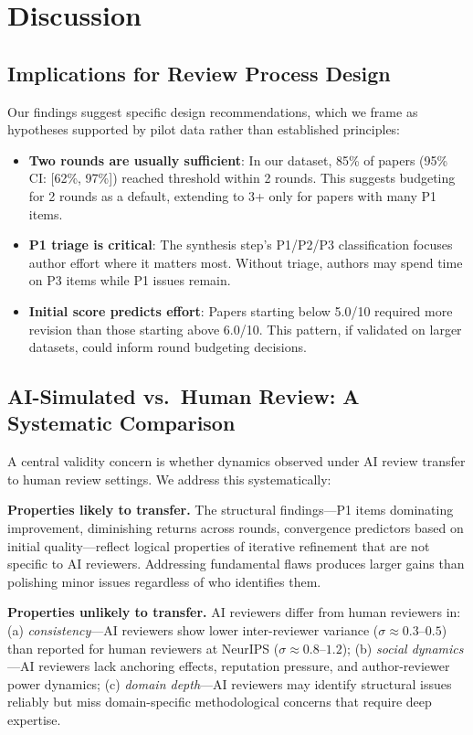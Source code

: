 \section{Discussion}

\subsection{Implications for Review Process Design}

Our findings suggest specific design recommendations, which we frame as hypotheses supported by pilot data rather than established principles:
\begin{itemize}
    \item \textbf{Two rounds are usually sufficient}: In our dataset, 85\% of papers (95\% CI: [62\%, 97\%]) reached threshold within 2 rounds. This suggests budgeting for 2 rounds as a default, extending to 3+ only for papers with many P1 items.
    \item \textbf{P1 triage is critical}: The synthesis step's P1/P2/P3 classification focuses author effort where it matters most. Without triage, authors may spend time on P3 items while P1 issues remain.
    \item \textbf{Initial score predicts effort}: Papers starting below 5.0/10 required more revision than those starting above 6.0/10. This pattern, if validated on larger datasets, could inform round budgeting decisions.
\end{itemize}

\subsection{AI-Simulated vs.\ Human Review: A Systematic Comparison}

A central validity concern is whether dynamics observed under AI review transfer to human review settings. We address this systematically:

\textbf{Properties likely to transfer.} The structural findings---P1 items dominating improvement, diminishing returns across rounds, convergence predictors based on initial quality---reflect logical properties of iterative refinement that are not specific to AI reviewers. Addressing fundamental flaws produces larger gains than polishing minor issues regardless of who identifies them.

\textbf{Properties unlikely to transfer.} AI reviewers differ from human reviewers in: (a) \emph{consistency}---AI reviewers show lower inter-reviewer variance ($\sigma \approx 0.3$--$0.5$) than reported for human reviewers at NeurIPS ($\sigma \approx 0.8$--$1.2$); (b) \emph{social dynamics}---AI reviewers lack anchoring effects, reputation pressure, and author-reviewer power dynamics; (c) \emph{domain depth}---AI reviewers may identify structural issues reliably but miss domain-specific methodological concerns that require deep expertise.

